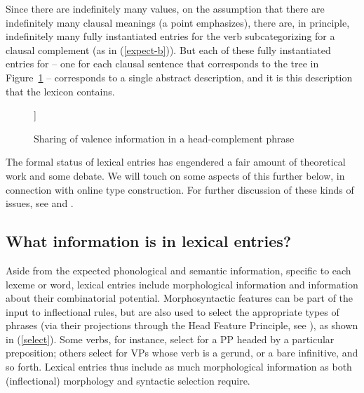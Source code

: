 \documentclass[output=paper,biblatex,babelshorthands,newtxmath,draftmode,colorlinks,citecolor=brown]{langscibook}
\begin{document}
Since there are indefinitely many  values, on the assumption that there are indefinitely many clausal meanings (a point \citealt[8--9]{Jackendoff1990} emphasizes), there are, in principle, indefinitely many fully instantiated entries for the verb  subcategorizing for a clausal complement (as in (\ref{expect-b})). 
But each of these fully instantiated entries for  -- one for each clausal sentence that corresponds to the tree in Figure~\ref{expect-b-tree} -- corresponds to a single abstract description, and it is this description that the lexicon contains. 

\begin{figure}
	\begin{forest}
	[ [{\avm{[comps & < \1 >]}} ] 
	[{\avm{[synsem & \1 ]}} ] ]
\end{forest}	
\caption{\label{expect-b-tree} Sharing of valence information in a head-complement phrase}
\end{figure}


The formal status of lexical entries has engendered a fair amount of theoretical work and some debate.
We will touch on some aspects of this further below, in connection with online type construction.
For further discussion of these kinds of issues, see  and .

\subsection{What information is in lexical entries?}
\label{lexicon:sec-what-information-is-in-lexical-entries}

Aside from the expected phonological and semantic information, specific to each lexeme or word,
lexical entries include morphological information and information about their combinatorial
potential. Morphosyntactic features can be part of the input to inflectional rules, but are also
used to select the appropriate types of phrases (via their projections through the Head Feature
Principle, see \crossrefchapteralt[\pageref{page-hfp}]{properties}), as shown in (\ref{select}). Some verbs, for instance, select for a PP headed by a particular preposition; others select for VPs whose verb is a gerund, or a bare infinitive, and so forth. Lexical entries thus include as much morphological information as both (inflectional) morphology and syntactic selection require.
\end{document}
